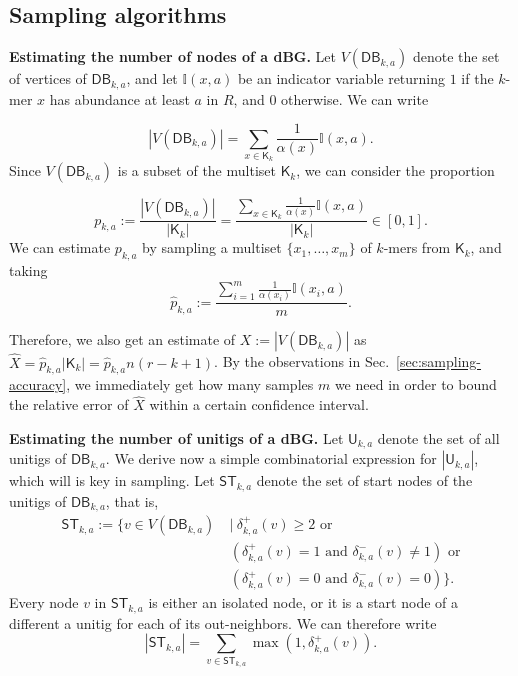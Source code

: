 \documentclass[a4paper,11pt]{article}
\newcommand{\alex}[1]{{\color{blue}{#1}}}
\newcommand{\DB}{\mathsf{DB}_{k,a}}
\newcommand{\U}{\mathsf{U}_{k,a}}
\newcommand{\ST}{\mathsf{ST}_{k,a}}
\newcommand{\dplus}{\delta^+_{k,a}}
\newcommand{\dminus}{\delta^-_{k,a}}
\newcommand{\K}{\mathsf{K}}
\newcommand{\abu}{\alpha}
\renewcommand{\geq}{\geqslant}
\begin{document}
\alex{Say that one of the main ideas is to do weighted sampling.}

\subsection{Sampling algorithms} %
\label{sub:algorithm}


\noindent \textbf{Estimating the number of nodes of a dBG.} Let $V(\DB)$ denote the set of vertices of $\DB$, and let $\mathbb{I}(x,a)$ be an indicator variable returning $1$ if the $k$-mer $x$ has abundance at least $a$ in $R$, and $0$ otherwise. We can write

\[|V(\DB)| = \sum_{x \in \K_k} \frac{1}{\abu(x)}\mathbb{I}(x,a).\]
Since $V(\DB)$ is a subset of the multiset $\K_k$, we can consider the proportion 

\[p_{k,a} := \frac{|V(\DB)|}{|\K_k|} = \frac{\sum_{x \in \K_k} \frac{1}{\abu(x)}\mathbb{I}(x,a)}{|\K_k|} \in [0,1].\]
%
%
We can estimate $p_{k,a}$ by sampling a multiset $\{x_1,\dots,x_m\}$ of $k$-mers from $\K_k$, and taking
\[\hat{p}_{k,a} := \frac{\sum_{i = 1}^m \frac{1}{\abu(x_i)}\mathbb{I}(x_i, a)}{m}.\]

Therefore, we also get an estimate of $X := |V(\DB)|$ as $\hat{X} = \hat{p}_{k,a}|\K_k| = \hat{p}_{k,a} n(r-k+1)$. By the observations in Sec.~\ref{sec:sampling-accuracy}, we immediately get how many samples $m$ we need in order to bound the relative error of $\hat{X}$ within a certain confidence interval.

\alex{Say that we can implement this for all abundances}

\medskip
\noindent \textbf{Estimating the number of unitigs of a dBG.} Let $\U$ denote the set of all unitigs of $\DB$. We derive now a simple combinatorial expression for $|\U|$, which will is key in sampling. Let $\ST$ denote the set of start nodes of the unitigs of $\DB$, that is, 
\begin{align*}
\ST := \{v \in V(\DB) \:&|\: \dplus(v) \geq 2 \text{ or } \\
& (\dplus(v) = 1 \text{ and } \dminus(v) \neq 1) \text{ or} \\
& (\dplus(v) = 0 \text{ and } \dminus(v) = 0)\}.
\end{align*}
Every node $v$ in $\ST$ is either an isolated node, or it is a start node of a different a unitig for each of its out-neighbors. We can therefore write
\[|\ST| = \sum_{v \in \ST} \max(1,\dplus(v)).\]
\end{document}
